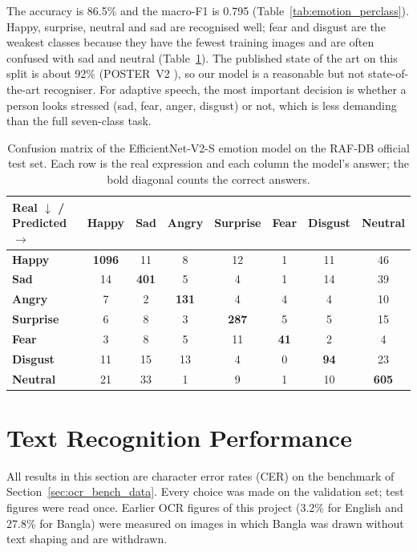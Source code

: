 The accuracy is 86.5\% and the macro-F1 is 0.795 (Table~\ref{tab:emotion_perclass}). Happy, surprise, neutral and sad are recognised well; fear and disgust are the weakest classes because they have the fewest training images and are often confused with sad and neutral (Table~\ref{tab:emotion_cm}). The published state of the art on this split is about 92\% (POSTER~V2 \cite{posterv2}), so our model is a reasonable but not state-of-the-art recogniser. For adaptive speech, the most important decision is whether a person looks stressed (sad, fear, anger, disgust) or not, which is less demanding than the full seven-class task.

\begin{table}[!htbp]
\centering
\caption{Confusion matrix of the EfficientNet-V2-S emotion model on the RAF-DB official test set. Each row is the real expression and each column the model's answer; the bold diagonal counts the correct answers.}
\label{tab:emotion_cm}
\begin{tabular}{|l|c|c|c|c|c|c|c|}
\hline
\textbf{Real $\downarrow$ / Predicted $\rightarrow$} & \textbf{Happy} & \textbf{Sad} & \textbf{Angry} & \textbf{Surprise} & \textbf{Fear} & \textbf{Disgust} & \textbf{Neutral} \\ \hline
\textbf{Happy} & \textbf{1096} & 11 & 8 & 12 & 1 & 11 & 46 \\ \hline
\textbf{Sad} & 14 & \textbf{401} & 5 & 4 & 1 & 14 & 39 \\ \hline
\textbf{Angry} & 7 & 2 & \textbf{131} & 4 & 4 & 4 & 10 \\ \hline
\textbf{Surprise} & 6 & 8 & 3 & \textbf{287} & 5 & 5 & 15 \\ \hline
\textbf{Fear} & 3 & 8 & 5 & 11 & \textbf{41} & 2 & 4 \\ \hline
\textbf{Disgust} & 11 & 15 & 13 & 4 & 0 & \textbf{94} & 23 \\ \hline
\textbf{Neutral} & 21 & 33 & 1 & 9 & 1 & 10 & \textbf{605} \\ \hline
\end{tabular}
\end{table}

\section{Text Recognition Performance}
\label{sec:ocr_results}

All results in this section are character error rates (CER) on the benchmark of Section~\ref{sec:ocr_bench_data}. Every choice was made on the validation set; test figures were read once. Earlier OCR figures of this project (3.2\% for English and 27.8\% for Bangla) were measured on images in which Bangla was drawn without text shaping and are withdrawn.

